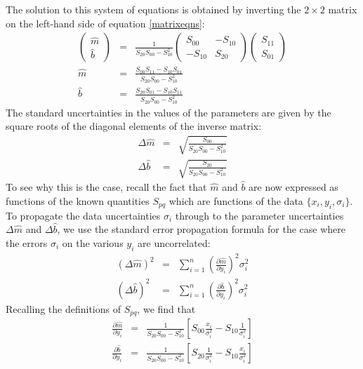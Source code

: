 \documentclass{article}
\begin{document}
The solution to this system of equations is obtained by inverting the $2 \times 2$ matrix on the left-hand side of equation \eqref{matrixeqns}:
\begin{eqnarray}
  \left(\begin{array}{c} \hat{m} \\ \hat{b} \end{array}\right) &=& \frac{1}{S_{20}S_{00} - S_{10}^2} \left(\begin{array}{cc} S_{00} & -S_{10} \\ -S_{10} & S_{20} \end{array}\right)\left(\begin{array}{c} S_{11} \\ S_{01} \end{array}\right) \label{matrix_inverted} \\
  \hat{m} &=& \frac{S_{00} S_{11} - S_{10} S_{01}}{S_{20}S_{00} - S_{10}^2 } \label{mhat_formula} \\ 
  \hat{b} &=& \frac{S_{20}S_{01} - S_{10} S_{11} }{S_{20}S_{00} - S_{10}^2 } \label{bhat_formula}
\end{eqnarray}
The standard uncertainties in the values of the parameters are given by the square roots of the diagonal elements of the inverse matrix:
\begin{eqnarray}
  \Delta \hat{m} &=& \sqrt{\frac{S_{00}}{S_{20}S_{00} - S_{10}^2}} \label{mhat_error} \\ 
  \Delta \hat{b} &=& \sqrt{\frac{S_{20}}{S_{20}S_{00} - S_{10}^2}} \label{bhat_error}
\end{eqnarray}
To see why this is the case, recall the fact that $\hat{m}$ and $\hat{b}$ are now expressed as functions of the known quantities $S_{pq}$ which are functions of the data $\{x_i, y_i, \sigma_i \}$. To propagate the data uncertainties $\sigma_i$ through to the parameter uncertainties $\Delta \hat{m}$ and $\Delta \hat{b}$, we use the standard error propagation formula for the case where the errors $\sigma_i$ on the various $y_i$ are uncorrelated:
\begin{eqnarray}
  \left(\Delta \hat{m}\right)^2 &=& \sum_{i=1}^{n} \left(\frac{\partial \hat{m}}{\partial y_i }\right)^2 \sigma_i^2 \label{errorpropagation_m} \\
  \left(\Delta \hat{b}\right)^2 &=& \sum_{i=1}^{n} \left(\frac{\partial \hat{b}}{\partial y_i }\right)^2 \sigma_i^2 \label{errorpropagation_b}
\end{eqnarray}
Recalling the definitions of $S_{pq}$, we find that 
\begin{eqnarray}
\frac{\partial \hat{m}}{\partial y_i} &=& \frac{1}{S_{20}S_{00} - S_{10}^2}\left[S_{00} \frac{x_i}{\sigma_i^2} - S_{10}\frac{1}{\sigma_i^2} \right] \\
\frac{\partial \hat{b}}{\partial y_i} &=& \frac{1}{S_{20}S_{00} - S_{10}^2}\left[S_{20} \frac{1}{\sigma_i^2} - S_{10}\frac{x_i}{\sigma_i^2} \right]
\end{eqnarray}
\end{document}
